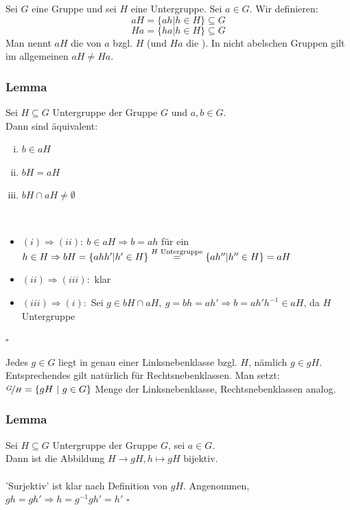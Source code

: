 Sei $G$ eine Gruppe und sei $H$ eine Untergruppe. Sei $a\in G$. Wir definieren:
\[aH=\{ah | h\in H\}\subseteq G\]
\[Ha=\{ha | h\in H\}\subseteq G\]
Man nennt $aH$ die  von $a$ bzgl. $H$ (und $Ha$ die ). In nicht abelschen Gruppen gilt im allgemeinen $aH\not=Ha$.

\subsubsection*{Lemma}
Sei $H\subseteq G$ Untergruppe der Gruppe $G$ und $a,b\in G$.\\
Dann sind äquivalent:
\begin{enumerate}[(i)]
	\item $b\in aH$
	\item $bH=aH$
	\item $bH \cap aH \not= \emptyset$
\end{enumerate}
\\
\begin{itemize}
	\item$(i)\Rightarrow (ii):~b\in aH \Rightarrow b=ah$ für ein $h\in H \Rightarrow bH=\{ahh' | h' \in H\}\\
	\stackrel{H\text{ Untergruppe}}{=}\{ah'' | h''\in H\}=aH$
	\item$(ii) \Rightarrow (iii):$ klar
	\item$(iii) \Rightarrow (i):$ Sei $g \in bH \cap aH,~g=bh=ah' \Rightarrow b=ah'h^{-1} \in aH$, da $H$ Untergruppe
\end{itemize}
\hfill $\square$

Jedes $g\in G$ liegt in genau einer Linksnebenklasse bzgl. $H$, nämlich $g \in gH$.
Entsprechendes gilt natürlich für Rechtsnebenklassen. Man setzt:\\
$\nicefrac{G}{H}=\{gH~|~g \in G \}$ Menge der Linksnebenklasse, Rechtsnebenklassen analog.

\subsubsection*{Lemma}
Sei $H\subseteq G$ Untergruppe der Gruppe $G$, sei $a \in G$.\\
Dann ist die Abbildung $H \to gH, h \mapsto gH$ bijektiv.\\
\\
'Surjektiv' ist klar nach Definition von $gH$. Angenommen, $gh=gh' \Rightarrow h=g^{-1}gh'=h'$
\hfill $\square$

